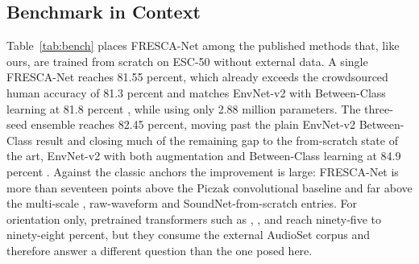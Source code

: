 \documentclass[conference]{IEEEtran}
\begin{document}
\subsection{Benchmark in Context}
Table~\ref{tab:bench} places FRESCA-Net among the published methods that, like ours, are trained from scratch on ESC-50 without external data. A single FRESCA-Net reaches 81.55 percent, which already exceeds the crowdsourced human accuracy of 81.3 percent \cite{piczak_dataset} and matches EnvNet-v2 with Between-Class learning at 81.8 percent \cite{tokozume_bc}, while using only 2.88 million parameters. The three-seed ensemble reaches 82.45 percent, moving past the plain EnvNet-v2 Between-Class result and closing much of the remaining gap to the from-scratch state of the art, EnvNet-v2 with both augmentation and Between-Class learning at 84.9 percent \cite{tokozume_bc}. Against the classic anchors the improvement is large: FRESCA-Net is more than seventeen points above the Piczak convolutional baseline \cite{piczak_cnn} and far above the multi-scale \cite{zhu_multiscale}, raw-waveform \cite{tokozume_envnet} and SoundNet-from-scratch \cite{aytar_soundnet} entries. For orientation only, pretrained transformers such as \cite{kong_panns}, \cite{gong_ast}, \cite{chen_beats} and \cite{elizalde_clap} reach ninety-five to ninety-eight percent, but they consume the external AudioSet corpus \cite{gemmeke_audioset} and therefore answer a different question than the one posed here.
\end{document}
